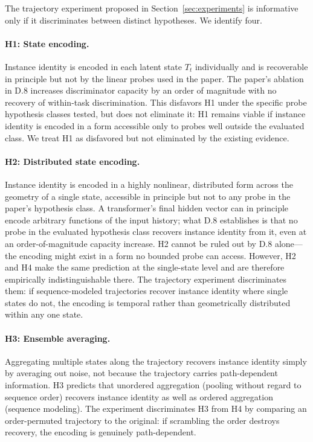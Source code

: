 \documentclass[11pt]{article}
\begin{document}
The trajectory experiment proposed in Section~\ref{sec:experiments} is informative only if it
discriminates between distinct hypotheses. We identify four.

\paragraph{H1: State encoding.} Instance identity is encoded in each latent state $T_t$
individually and is recoverable in principle but not by the linear probes used in the paper.
The paper's ablation in D.8 increases discriminator capacity by an order of magnitude with no
recovery of within-task discrimination. This disfavors H1 under the specific probe hypothesis
classes tested, but does not eliminate it: H1 remains viable if instance identity is encoded
in a form accessible only to probes well outside the evaluated class. We treat H1 as
disfavored but not eliminated by the existing evidence.

\paragraph{H2: Distributed state encoding.} Instance identity is encoded in a highly nonlinear,
distributed form across the geometry of a single state, accessible in principle but not to any
probe in the paper's hypothesis class. A transformer's final hidden vector can in principle
encode arbitrary functions of the input history; what D.8 establishes is that no probe in the
evaluated hypothesis class recovers instance identity from it, even at an order-of-magnitude
capacity increase. H2 cannot be ruled out by D.8 alone---the encoding might exist in a form no
bounded probe can access. However, H2 and H4 make the same prediction at the single-state level
and are therefore empirically indistinguishable there. The trajectory experiment discriminates
them: if sequence-modeled trajectories recover instance identity where single states do not, the
encoding is temporal rather than geometrically distributed within any one state.

\paragraph{H3: Ensemble averaging.} Aggregating multiple states along the trajectory recovers
instance identity simply by averaging out noise, not because the trajectory carries
path-dependent information. H3 predicts that unordered aggregation (pooling without regard to
sequence order) recovers instance identity as well as ordered aggregation (sequence modeling).
The experiment discriminates H3 from H4 by comparing an order-permuted trajectory to the
original: if scrambling the order destroys recovery, the encoding is genuinely path-dependent.
\end{document}

